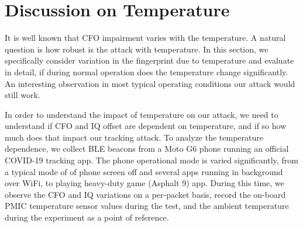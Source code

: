 
\section{Discussion on Temperature}
\label{sec:discussion}

It is well known that CFO impairment varies with the temperature. A natural question is how robust is the attack with temperature. In this section, we specifically consider variation in the fingerprint due to temperature and evaluate in detail, if during normal operation does the temperature change significantly. An interesting observation in most typical operating conditions our attack would still work. 

In order to understand the impact of temperature on our attack, we need to understand if CFO and IQ offset are dependent on temperature, and if so how much does that impact our tracking attack.
%
To analyze the temperature dependence, we collect BLE beacons from a Moto G6 phone running an official COVID-19 tracking app. 
%
The phone operational mode is varied significantly, from a typical mode of of phone screen off and several apps running in background over WiFi, to playing heavy-duty game (Asphalt 9) app. During this time, we observe the CFO and IQ variations on a per-packet basis, record the on-board PMIC temperature sensor values during the test, and the ambient temperature during the experiment as a point of reference. 

